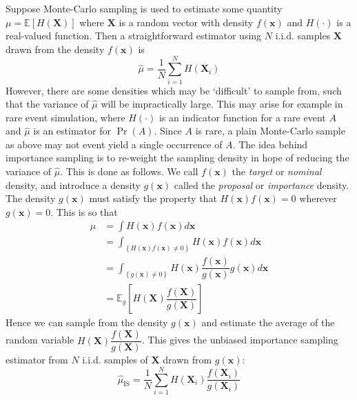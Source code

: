 \documentclass[11pt]{report} %
\begin{document}
Suppose Monte-Carlo sampling is used to estimate some quantity $\mu = \mathbb{E}\left[H\left(\mathbf{X}\right)\right]$ where $\mathbf{X}$ is a random vector with density $f\left(\mathbf{x}\right)$ and $H\left(\cdot\right)$ is a real-valued function. Then a straightforward estimator using $N$ i.i.d. samples $\mathbf{X}$ drawn from the density $f\left(\mathbf{x}\right)$ is
\begin{equation}
\hat{\mu} = \dfrac{1}{N}\sum_{i = 1}^{N}H\left(\mathbf{X}_{i}\right)
\end{equation}
However, there are some densities which may be `difficult' to sample from, such that the variance of $\hat{\mu}$ will be impractically large. This may arise for example in rare event simulation, where $H\left(\cdot\right)$ is an indicator function for a rare event $A$ and $\hat{\mu}$ is an estimator for $\operatorname{Pr}\left(A\right)$. Since $A$ is rare, a plain Monte-Carlo sample as above may not event yield a single occurrence of $A$. The idea behind importance sampling is to re-weight the sampling density in hope of reducing the variance of $\hat{\mu}$. This is done as follows. We call $f\left(\mathbf{x}\right)$ the \textit{target} or \textit{nominal} density, and introduce a density $g\left(\mathbf{x}\right)$ called the \textit{proposal} or \textit{importance} density. The density $g\left(\mathbf{x}\right)$ must satisfy the property that $H\left(\mathbf{x}\right)f\left(\mathbf{x}\right) = 0$ wherever $g\left(\mathbf{x}\right) = 0$. This is so that
\begin{align}
\mu &= \int H\left(\mathbf{x}\right)f\left(\mathbf{x}\right) d\mathbf{x} \\
&= \int_{\left\{H\left(\mathbf{x}\right)f\left(\mathbf{x}\right) \neq 0 \right\}} H\left(\mathbf{x}\right)f\left(\mathbf{x}\right) d\mathbf{x} \\
&= \int_{\left\{g\left(\mathbf{x}\right) \neq 0 \right\}} H\left(\mathbf{x}\right)\dfrac{f\left(\mathbf{x}\right)}{g\left(\mathbf{x}\right)}g\left(\mathbf{x}\right) d\mathbf{x} \\
&= \mathbb{E}_{g}\left[H\left(\mathbf{X}\right)\dfrac{f\left(\mathbf{X}\right)}{g\left(\mathbf{X}\right)}\right]
\end{align}
Hence we can sample from the density $g\left(\mathbf{x}\right)$ and estimate the average of the random variable $H\left(\mathbf{X}\right)\dfrac{f\left(\mathbf{X}\right)}{g\left(\mathbf{X}\right)}$. This gives the unbiased importance sampling estimator from $N$ i.i.d. samples of $\mathbf{X}$ drawn from $g\left(\mathbf{x}\right)$:
\begin{equation}
\hat{\mu}_{\mathrm{IS}} = \dfrac{1}{N}\sum_{i = 1}^{N}H\left(\mathbf{X}_{i}\right)\dfrac{f\left(\mathbf{X}_{i}\right)}{g\left(\mathbf{X}_{i}\right)}
\end{equation}
\end{document}

